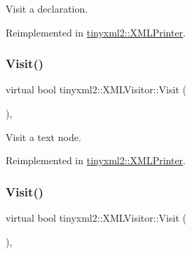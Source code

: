 Visit a declaration. 



Reimplemented in \hyperlink{classtinyxml2_1_1_x_m_l_printer_acfc625b2549304b9c7eb85ebd5c5eb39}{tinyxml2\+::\+X\+M\+L\+Printer}.

\mbox{\label{classtinyxml2_1_1_x_m_l_visitor_af30233565856480ea48b6fa0d6dec65b}} 
\subsubsection{\texorpdfstring{Visit()}{Visit()}\hspace{0.1cm}{\footnotesize\ttfamily [2/4]}}
{\footnotesize\ttfamily virtual bool tinyxml2\+::\+X\+M\+L\+Visitor\+::\+Visit (\begin{DoxyParamCaption}\item[{const \hyperlink{classtinyxml2_1_1_x_m_l_text}{X\+M\+L\+Text} \&}]{ }\end{DoxyParamCaption})\hspace{0.3cm}{\ttfamily [inline]}, {\ttfamily [virtual]}}



Visit a text node. 



Reimplemented in \hyperlink{classtinyxml2_1_1_x_m_l_printer_adc0e42b4f6fcb90a95630c79575d030b}{tinyxml2\+::\+X\+M\+L\+Printer}.

\mbox{\label{classtinyxml2_1_1_x_m_l_visitor_acc8147fb5a85f6c65721654e427752d7}} 
\subsubsection{\texorpdfstring{Visit()}{Visit()}\hspace{0.1cm}{\footnotesize\ttfamily [3/4]}}
{\footnotesize\ttfamily virtual bool tinyxml2\+::\+X\+M\+L\+Visitor\+::\+Visit (\begin{DoxyParamCaption}\item[{const \hyperlink{classtinyxml2_1_1_x_m_l_comment}{X\+M\+L\+Comment} \&}]{ }\end{DoxyParamCaption})\hspace{0.3cm}{\ttfamily [inline]}, {\ttfamily [virtual]}}



